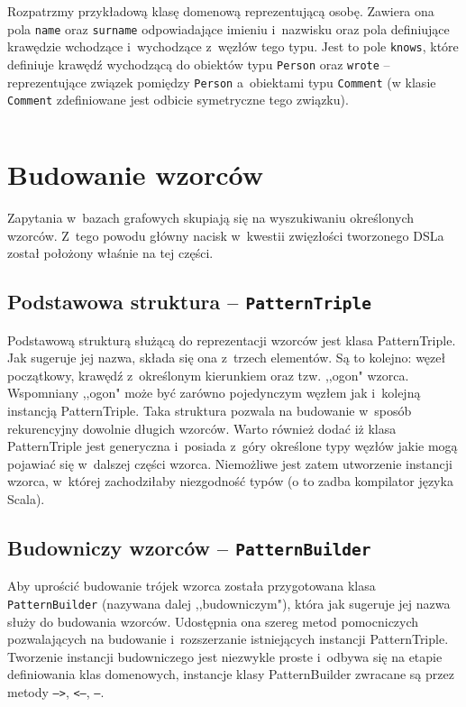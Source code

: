 \documentclass[brudnopis]{xmgr}
\begin{document}
Rozpatrzmy przykładową klasę domenową reprezentującą osobę. Zawiera ona pola \texttt{name} oraz \texttt{surname} odpowiadające imieniu i~nazwisku oraz pola definiujące krawędzie wchodzące i~wychodzące z~węzłów tego typu. Jest to pole \texttt{knows}, które definiuje krawędź wychodzącą do obiektów typu \texttt{Person} oraz \texttt{wrote} -- reprezentujące związek pomiędzy \texttt{Person} a~obiektami typu \texttt{Comment} (w klasie \texttt{Comment} zdefiniowane jest odbicie symetryczne tego związku).

\inputminted{scala}{listings/scala/dsl/sample-model.scala}

\section{Budowanie wzorców}

Zapytania w~bazach grafowych skupiają się na wyszukiwaniu określonych wzorców. Z~tego powodu główny nacisk w~kwestii zwięzłości tworzonego DSLa został położony właśnie na tej części.

\subsection{Podstawowa struktura -- \texttt{PatternTriple}}
Podstawową strukturą służącą do reprezentacji wzorców jest klasa PatternTriple. Jak sugeruje jej nazwa, składa się ona z~trzech elementów. Są to kolejno: węzeł początkowy, krawędź z~określonym kierunkiem oraz tzw. ,,ogon" wzorca. Wspomniany ,,ogon" może być zarówno pojedynczym węzłem jak i~kolejną instancją PatternTriple. Taka struktura pozwala na budowanie w~sposób rekurencyjny dowolnie długich wzorców. Warto również dodać iż klasa PatternTriple jest generyczna i~posiada z~góry określone typy węzłów jakie mogą pojawiać się w~dalszej części wzorca. Niemożliwe jest zatem utworzenie instancji wzorca, w~której zachodziłaby niezgodność typów (o to zadba kompilator języka Scala).

\subsection{Budowniczy wzorców -- \texttt{PatternBuilder}}
Aby uprościć budowanie trójek wzorca została przygotowana klasa \texttt{PatternBuilder} (nazywana dalej ,,budowniczym"), która jak sugeruje jej nazwa służy do budowania wzorców. Udostępnia ona szereg metod pomocniczych pozwalających na budowanie i~rozszerzanie istniejących instancji PatternTriple. Tworzenie instancji budowniczego jest niezwykle proste i~odbywa się na etapie definiowania klas domenowych, instancje klasy PatternBuilder zwracane są przez metody \texttt{-->}, \texttt{<--}, \texttt{--}.
\end{document}

